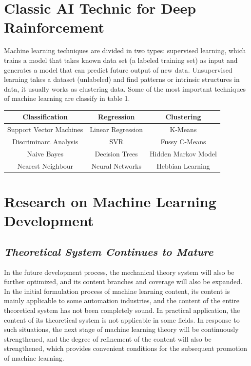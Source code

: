 \documentclass{article}
\begin{document}
\section{Classic AI Technic for Deep Rainforcement}

Machine learning techniques are divided in two types: supervised learning, which trains a model that takes known data set (a labeled training set) as input and generates a model that can predict future output of new data. Unsupervised learning takes a dataset (unlabeled) and find patterns or intrinsic structures in data, it usually works as clustering data. Some of the most important techniques of machine learning are classify in table 1.\\

\begin{tabular}{|c|c|c|}

\hline
\textbf{Classification} & \textbf{Regression} & \textbf{Clustering} \\
\hline
Support Vector Machines & Linear Regression & K-Means \\
\hline
Discriminant Analysis & SVR & Fussy C-Means \\
\hline
Naive Bayes & Decision Trees & Hidden Markov Model \\
\hline
Nearest Neighbour & Neural Networks & Hebbian Learning \\
\hline
\end{tabular}

\section{Research on Machine Learning Development}
\subsection{\emph{Theoretical System Continues to Mature}}

In the future development process, the mechanical theory system will also be further optimized, and its 
content branches and coverage will also be expanded. In the initial formulation process of machine 
learning content, its content is mainly applicable to some automation industries, and the content of the 
entire theoretical system has not been completely sound. In practical application, the content of its 
theoretical system is not applicable in some fields. In response to such situations, the next stage of 
machine learning theory will be continuously strengthened, and the degree of refinement of the content 
will also be strengthened, which provides convenient conditions for the subsequent promotion of 
machine learning.
\\\\
\end{document}

